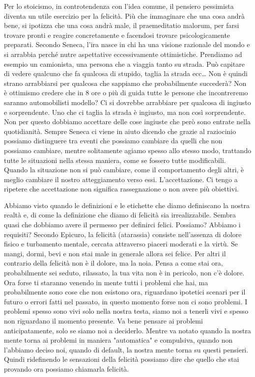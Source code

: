 \documentclass[12pt]{book} %
\begin{document}
Per lo stoicismo, in controtendenza con l'idea comune, il pensiero pessimista diventa un utile
esercizio per la felicità. Più che immaginare che una cosa andrà bene, si ipotizza che una cosa andrà male, il praemeditatio malorum, per farsi
trovare pronti e reagire concretamente e facendosi trovare psicologicamente preparati. Secondo Seneca, l'ira nasce in chi ha una visione razionale del mondo e si arrabbia perché nutre aspettative eccessivamente ottimistiche. Prendiamo ad esempio un
camionista, una persona che a viaggia tanto su strada. Può capitare di vedere qualcuno che fa qualcosa di stupido,
taglia la strada ecc… Non è quindi strano arrabbiarsi per qualcosa che sappiamo che probabilmente succederà? Non è
ottimismo credere che in 8 ore o più di guida tutte le persone che incontreremo saranno automobilisti modello? Ci si dovrebbe
arrabbiare per qualcosa di ingiusto e sorprendente. Uno che ci taglia la strada è ingiusto, ma non così
sorprendente. Non per questo dobbiamo accettare delle cose ingiuste che però sono entrate nella quotidianità. Sempre
Seneca ci viene in aiuto dicendo che grazie al raziocinio possiamo distinguere tra eventi che possiamo cambiare da
quelli che non possiamo cambiare, mentre solitamente agiamo spesso allo stesso modo, trattando tutte le situazioni nella stessa maniera, come se fossero tutte modificabili. Quando la situazione non si può cambiare, come il comportamento degli
altri, è meglio cambiare il nostro atteggiamento verso essi. L'accettazione. Ci
tengo a ripetere che accettazione non significa rassegnazione o non avere più obiettivi.

Abbiamo visto quando le definizioni e le etichette che diamo definiscano la nostra realtà e, di come la definizione che
diamo di felicità sia irrealizzabile. Sembra quasi che dobbiamo avere il permesso per definirci felici. Possiamo?
Abbiamo i requisiti? Secondo Epicuro, la felicità (atarassia) consiste nell’assenza di dolore fisico e turbamento mentale, cercata attraverso piaceri moderati e la virtù. Se mangi, dormi, bevi e non 
stai male in generale allora sei felice. Per altri il contrario della felicità non è il dolore, ma la noia. Pensa a
come stai ora, probabilmente sei seduto, rilassato, la tua vita non è in pericolo, non c'è dolore.
Ora forse ti staranno venendo in mente tutti i problemi che hai, ma probabilmente sono cose che non
esistono ora, riguardano ipotetici scenari per il futuro o errori fatti nel passato, in questo momento forse non ci sono
problemi. I problemi spesso sono vivi solo nella nostra testa, siamo noi a tenerli vivi e spesso non riguardano il
momento presente. Va bene pensare ai problemi anticipatamente, solo se siamo noi a deciderlo. Mentre va notato quando la nostra mente torna ai problemi in maniera "automatica" e compulsiva, quando non l'abbiamo deciso noi, quando di default, la nostra mente torna su questi pensieri.
Quindi ridefinendo le sensazioni della felicità possiamo dire che quello che stai provando ora possiamo chiamarla felicità. 
\end{document}
